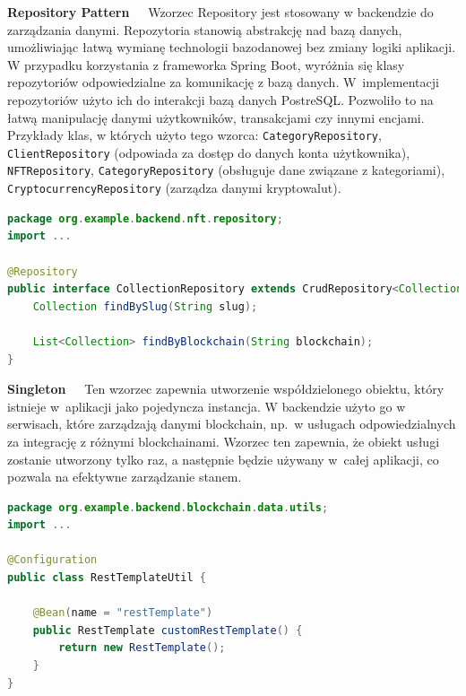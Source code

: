 \noindent \textbf{Repository Pattern~~}
Wzorzec Repository jest stosowany w backendzie do zarządzania danymi. Repozytoria stanowią abstrakcję nad bazą danych, umożliwiając łatwą wymianę technologii bazodanowej bez zmiany logiki aplikacji. W przypadku korzystania z frameworka Spring Boot, wyróżnia się klasy repozytoriów odpowiedzialne za komunikację z bazą danych. W~implementacji repozytoriów użyto ich do interakcji bazą danych PostreSQL. Pozwoliło to  na łatwą manipulację danymi użytkowników, transakcjami czy innymi encjami. Przykłady klas, w których użyto tego wzorca: \texttt{CategoryRepository}, \texttt{ClientRepository} (odpowiada za dostęp do danych konta użytkownika), \texttt{NFTRepository},   \texttt{CategoryRepository} (obsługuje dane związane z kategoriami), \texttt{CryptocurrencyRepository} (zarządza danymi kryptowalut).\\[-10pt]
\begin{lstlisting}[language=Java, style=JavaStyle]
package org.example.backend.nft.repository;
import ...

@Repository
public interface CollectionRepository extends CrudRepository<Collection, Long> {
    Collection findBySlug(String slug);

    List<Collection> findByBlockchain(String blockchain);
}
\end{lstlisting}
\noindent \textbf{Singleton~~}
Ten wzorzec zapewnia utworzenie współdzielonego obiektu, który istnieje w~aplikacji jako pojedyncza instancja. W backendzie użyto go w serwisach, które zarządzają danymi blockchain, np.\ w usługach odpowiedzialnych za integrację z różnymi blockchainami. Wzorzec ten zapewnia, że obiekt usługi zostanie utworzony tylko raz, a następnie będzie używany w~całej aplikacji, co pozwala na efektywne zarządzanie stanem.\\[-10pt]
\begin{lstlisting}[language=Java, style=JavaStyle]
package org.example.backend.blockchain.data.utils;
import ...

@Configuration
public class RestTemplateUtil {

    @Bean(name = "restTemplate")
    public RestTemplate customRestTemplate() {
        return new RestTemplate();
    }
}

\end{lstlisting}


